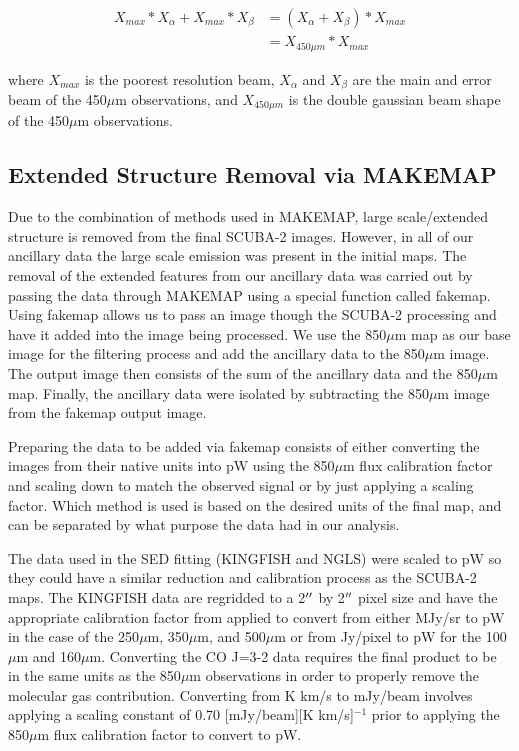 \begin{equation} \label{eq_GBSmethod}
  \begin{split}
    X_{max} \ast X_{\alpha} + X_{max} \ast X_{\beta} & = \left(X_{\alpha} + X_{\beta}\right) \ast X_{max} \\
     & = X_{450\mu m} \ast X_{max}
   \end{split}
\end{equation}

\noindent where $X_{max}$ is the poorest resolution beam, $X_{\alpha}$ and $X_{\beta}$ are the main and error beam of the 450$\mu$m observations, and $X_{450\mu m}$ is the double gaussian beam shape of the 450$\mu$m observations.

\subsection{Extended Structure Removal via MAKEMAP}\label{fakesource_sec}


Due to the combination of methods used in MAKEMAP, large scale/extended structure is removed from the final SCUBA-2 images.  However, in all of our ancillary data the large scale emission was present in the initial maps.  The removal of the extended features from our ancillary data was carried out by passing the data through MAKEMAP using a special function called fakemap.  Using fakemap allows us to pass an image though the SCUBA-2 processing and have it added into the image being processed.  We use the 850$\mu$m map as our base image for the filtering process and add the ancillary data to the 850$\mu$m image.  The output image then consists of the sum of the ancillary data and the 850$\mu$m map.  Finally, the ancillary data were isolated by subtracting the 850$\mu$m image from the fakemap output image.  

Preparing the data to be added via fakemap consists of either converting the images from their native units into pW using the 850$\mu$m flux calibration factor and scaling down to match the observed signal or by just applying a scaling factor.  Which method is used is based on the desired units of the final map, and can be separated by what purpose the data had in our analysis.

The data used in the SED fitting (KINGFISH and NGLS) were scaled to pW so they could have a similar reduction and calibration process as the SCUBA-2 maps.   The KINGFISH data are regridded to a 2$\mbox{$^{\prime\prime}$}$ by 2$\mbox{$^{\prime\prime}$}$ pixel size and have the appropriate calibration factor from \cite{dempsey2013} applied to convert from either MJy/sr to pW in the case of the 250$\mu$m, 350$\mu$m, and 500$\mu$m or from Jy/pixel to pW for the 100$\mu$m and 160$\mu$m.  Converting the CO J=3-2 data requires the final product to be in the same units as the 850$\mu$m observations in order to properly remove the molecular gas contribution.  Converting from K km/s to mJy/beam involves applying a scaling constant of 0.70 [mJy/beam][K km/s]$^{-1}$ \citep{drabek2012} prior to applying the 850$\mu$m flux calibration factor to convert to pW.  

